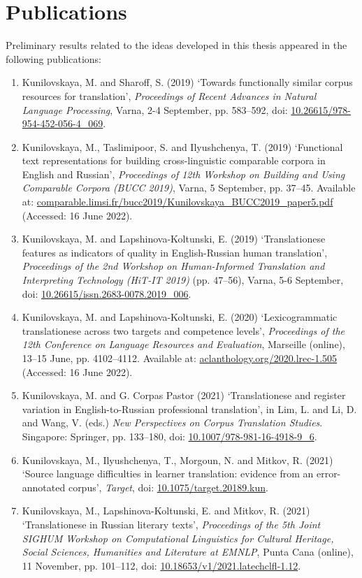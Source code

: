 \section{\label{sec:papers}Publications}
Preliminary results related to the ideas developed in this thesis appeared in the following publications:
\begin{enumerate}\compresslist{}
	\item Kunilovskaya, M. and Sharoff, S. (2019) `Towards functionally similar corpus resources for translation', \textit{Proceedings of Recent Advances in Natural Language Processing}, Varna, 2-4 September, pp. 583–592, doi: \url{10.26615/978-954-452-056-4\_069}.
	\item Kunilovskaya, M., Taslimipoor, S. and Ilyushchenya, T. (2019) `Functional text representations for building cross-linguistic comparable corpora in English and Russian', \textit{Proceedings of 12th Workshop on Building and Using Comparable Corpora (BUCC 2019)}, Varna, 5 September, pp. 37--45. Available at: \url{comparable.limsi.fr/bucc2019/Kunilovskaya\_BUCC2019\_paper5.pdf} (Accessed: 16 June 2022).
	\item Kunilovskaya, M. and Lapshinova-Koltunski, E. (2019) `Translationese features as indicators of quality in English-Russian human translation', \textit{Proceedings of the 2nd Workshop on Human-Informed Translation and Interpreting Technology (HiT-IT 2019)} (pp. 47–56), Varna, 5-6 September, doi: \url{10.26615/issn.2683-0078.2019\_006}.
	\item Kunilovskaya, M. and Lapshinova-Koltunski, E. (2020) `Lexicogrammatic translationese across two targets and competence levels', \textit{Proceedings of the 12th Conference on Language Resources and Evaluation}, Marseille (online), 13--15 June, pp. 4102–4112. Available at: \url{aclanthology.org/2020.lrec-1.505} (Accessed: 16 June 2022).
	\item Kunilovskaya, M. and G. Corpas Pastor (2021) `Translationese and register variation in English-to-Russian professional translation', in Lim, L. and  Li, D. and Wang, V. (eds.) \textit{New Perspectives on Corpus Translation Studies}. Singapore: Springer, pp. 133--180, doi: \url{10.1007/978-981-16-4918-9\_6}.
	\item Kunilovskaya, M., Ilyushchenya, T., Morgoun, N. and Mitkov, R. (2021) `Source language difficulties in learner translation: evidence from an error-annotated corpus', \textit{Target}, doi: \url{10.1075/target.20189.kun}. 
	\item Kunilovskaya, M., Lapshinova-Koltunski, E. and Mitkov, R. (2021) `Translationese in Russian literary texts', \textit{Proceedings of the 5th Joint SIGHUM Workshop on Computational Linguistics for Cultural Heritage, Social Sciences, Humanities and Literature at EMNLP}, Punta Cana (online), 11 November, pp. 101--112, doi: \url{10.18653/v1/2021.latechclfl-1.12}.
\end{enumerate}

